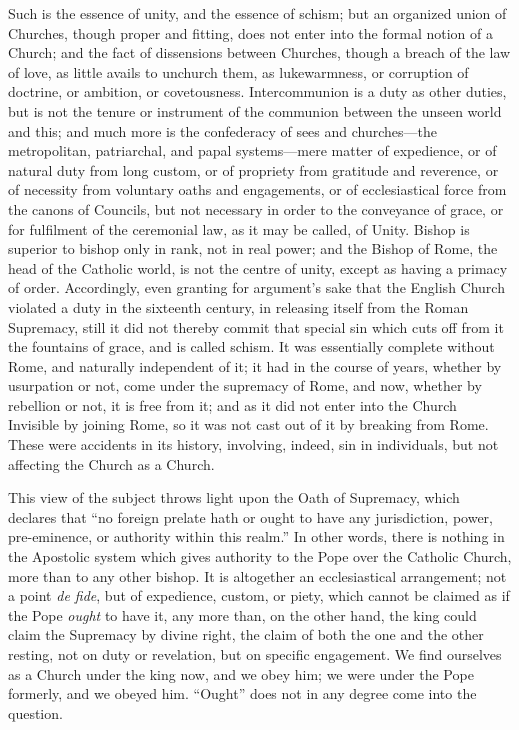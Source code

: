 Such is the essence of unity, and the essence of
schism; but an organized union of Churches, though proper and fitting,
does not enter into the formal notion of a Church; and the fact
of dissensions between Churches, though a breach of the law of love,
as little avails to unchurch them, as lukewarmness, or corruption of
doctrine, or ambition, or covetousness. Intercommunion is a duty as
other duties, but is not the tenure or instrument of the communion
between the unseen world and this; and much more is the confederacy of
sees and churches—the metropolitan, patriarchal, and papal
systems—mere matter of expedience, or of natural duty from long
custom, or of propriety from gratitude and reverence, or of necessity
from voluntary oaths and engagements, or of ecclesiastical force from
the canons of Councils, but not necessary in order to the conveyance
of grace, or for fulfilment of the ceremonial law, as it may be
called, of Unity. Bishop is superior to bishop only in rank, not in
real power; and the Bishop of Rome, the head of the Catholic world, is
not the centre of unity, except as having a primacy of order.
Accordingly, even granting for argument's sake that the English Church
violated a duty in the sixteenth century, in releasing itself from the
Roman Supremacy, still it did not thereby commit that special sin
which cuts off from it the fountains of grace, and is called schism.
It was essentially complete without Rome, and naturally independent of
it; it had in the course of years, whether by usurpation or not, come
under the supremacy of Rome, and now, whether by rebellion or not, it
is free from it; and as it did not enter into the Church Invisible by
joining Rome, so it was not cast out of it by breaking from Rome.
These were accidents in its history, involving, indeed, sin in
individuals, but not affecting the Church as a Church.

This view of the subject throws light upon the
Oath of Supremacy, which declares that ``no foreign prelate hath
or ought to have any jurisdiction, power, pre-eminence, or authority
within this realm.'' In other words, there is nothing in the Apostolic
system which gives authority to the Pope over the Catholic Church,
more than to any other bishop. It is altogether an ecclesiastical
arrangement; not a point \emph{de fide}, but of expedience, custom, or
piety, which cannot be claimed as if the Pope \emph{ought} to have it,
any more than, on the other hand, the king could claim the Supremacy
by divine right, the claim of both the one and the other resting, not
on duty or revelation, but on specific engagement. We find ourselves
as a Church under the king now, and we obey him; we were under the
Pope formerly, and we obeyed him. ``Ought'' does not in any degree come
into the question.

